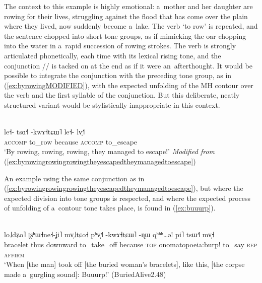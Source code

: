 The context to this example is highly emotional: a~mother and her daughter are rowing for their
lives, struggling against the flood that has come over the plain where they lived, now suddenly
become a~lake. The verb ‘to row’ is repeated, and the sentence chopped into short tone groups, as if mimicking the oar chopping into the water in a~rapid succession of rowing strokes. The
verb is strongly articulated phonetically, each time with its lexical rising tone, and the conjunction
// is tacked on at the end as if it were an~afterthought. 
It would be possible
to integrate the conjunction with the preceding tone group, as in (\ref{ex:byrowingMODIFIED}), with the expected
unfolding of the MH contour over the verb and the first syllable of the conjunction. But this
deliberate, neatly structured variant would be stylistically inappropriate in this context.



\begin{exe}
	\ex
	\label{ex:byrowingMODIFIED}
	\\
	\gll le˧-		tsɑ˧˥		-kwɤ˧tɕɯ˥	le˧-		lv̩˧˥\\
	\textsc{accomp}	to\_row		because	\textsc{accomp}	to\_escape\\
	\glt ‘By rowing, rowing, rowing, they managed to escape!’ \textit{Modified from} (\ref{ex:byrowingrowingrowingtheyescapedtheymanagedtoescape})
\end{exe}

An example using the same conjunction as in (\ref{ex:byrowingrowingrowingtheyescapedtheymanagedtoescape}), but where the expected division into tone groups is
respected, and where the expected process of unfolding of a~contour tone takes place, is found in (\ref{ex:buuurp}).
\begin{exe}
  \ex
  \label{ex:buuurp} 
  \\
  \gll lo˩dʑo˥	ʈʂʰɯ˧ne˧-ʝi˥	mv̩˩tɕo˧	pʰv̩˧˥	-kwɤ˧tɕɯ˥	-ɳɯ qʰʰʰ{\dots}ə!			pi˥	tsɯ˧˥	mv̩˧\\
  bracelet	thus	downward	to\_take\_off	because		\textsc{top} onomatopoeia:burp!		to\_say
  \textsc{rep}	\textsc{affirm}\\
  \glt ‘When [the man] took off [the buried woman’s bracelets], like this, [the corpse made
    a~gurgling sound]: Buuurp!’ (BuriedAlive2.48)
\end{exe}

